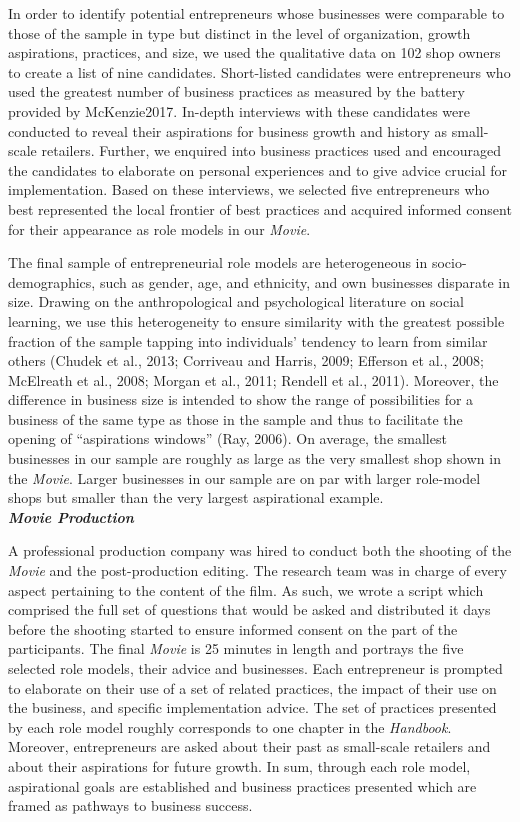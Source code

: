 \documentclass[11.5pt]{article}
\begin{document}
\noindent In order to identify potential entrepreneurs whose businesses were comparable to those of the sample in type but distinct in the level of organization, growth aspirations, practices, and size, we used the qualitative data on 102 shop owners to create a list of nine candidates. Short-listed candidates were entrepreneurs who used the greatest number of business practices as measured by the battery provided by McKenzie2017. In-depth interviews with these candidates were conducted to reveal their aspirations for business growth and history as small-scale retailers. Further, we enquired into business practices used and encouraged the candidates to elaborate on personal experiences and to give advice crucial for implementation. Based on these interviews, we selected five entrepreneurs who best represented the local frontier of best practices and acquired informed consent for their appearance as role models in our \emph{Movie}.

The final sample of entrepreneurial role models are heterogeneous in socio-demographics, such as gender, age, and ethnicity, and own businesses disparate in size. Drawing on the anthropological and psychological literature on social learning, we use this heterogeneity to ensure similarity with the greatest possible fraction of the sample tapping into individuals' tendency to learn from similar others (Chudek et al., 2013; Corriveau and Harris, 2009; Efferson et al., 2008; McElreath et al., 2008; Morgan et al., 2011; Rendell et al., 2011). Moreover, the difference in business size is intended to show the range of possibilities for a business of the same type as those in the sample and thus to facilitate the opening of ``aspirations windows'' (Ray, 2006). On average, the smallest businesses in our sample are roughly as large as the very smallest shop shown in the \emph{Movie}. Larger businesses in our sample are on par with larger role-model shops but smaller than the very largest aspirational example.\\

\noindent \emph{\textbf{Movie Production}}\

\noindent A professional production company was hired to conduct both the shooting of the \emph{Movie} and the post-production editing. The research team was in charge of every aspect pertaining to the content of the film. As such, we wrote a script which comprised the full set of questions that would be asked and distributed it days before the shooting started to ensure informed consent on the part of the participants. The final \emph{Movie} is 25 minutes in length and portrays the five selected role models, their advice and businesses. Each entrepreneur is prompted to elaborate on their use of a set of related practices, the impact of their use on the business, and specific implementation advice. The set of practices presented by each role model roughly corresponds to one chapter in the \emph{Handbook}. Moreover, entrepreneurs are asked about their past as small-scale retailers and about their aspirations for future growth. In sum, through each role model, aspirational goals are established and business practices presented which are framed as pathways to business success. \\
\end{document}
